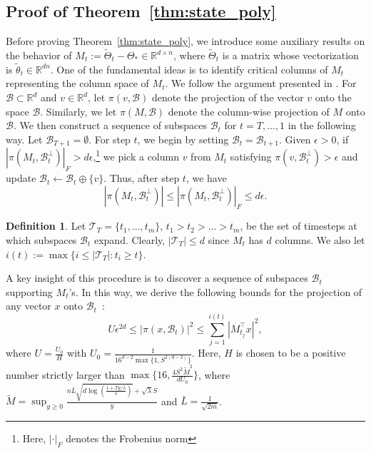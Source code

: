 \documentclass[11pt]{article}
\theoremstyle{plain}
\theoremstyle{definition}
\newtheorem{defn}[thm]{Definition}
\theoremstyle{remark}
\begin{document}
\subsection{Proof of Theorem~\ref{thm:state_poly}}\label{app:polystate}

Before proving Theorem~\ref{thm:state_poly},
we introduce some auxiliary results on the behavior of $M_t := \tilde \Theta_t - \Theta_* \in \mathbb{R}^{d \times n}$, where $\tilde \Theta_t$ is a matrix whose vectorization is $\tilde \theta_t \in \mathbb{R}^{dn}$.
One of the fundamental ideas is to identify critical columns of $M_t$ representing the column space of $M_t$.
We follow the argument presented in  \cite[Appendix D]{abbasi2011regret}. 
For $\mathcal{B} \subset \mathbb{R}^d$ and $v\in\mathbb{R}^d$, let $\pi(v,\mathcal{B})$ denote the projection of the vector $v$ onto the space $\mathcal{B}$.
Similarly, we let $\pi(M,\mathcal{B})$ denote the column-wise projection of $M$ onto $\mathcal{B}$.
We then construct a sequence of subspaces $\mathcal{B}_t$ for $t=T,\ldots,1$ in the following way.
Let $\mathcal{B}_{T+1} =\emptyset$.
For step $t$, we begin by setting $\mathcal{B}_{t}=\mathcal{B}_{t+1}$.
Given $\epsilon > 0$, 
if $|\pi(M_t,\mathcal{B}_t^\perp)|_F>d\epsilon$,\footnote{Here, $|\cdot|_F$ denotes the Frobenius norm} we pick a column $v$ from $M_t$ satisfying $\pi(v,\mathcal{B}_t^\perp)>\epsilon$ and update $\mathcal{B}_t\leftarrow\mathcal{B}_t\oplus \{v\}$.
Thus, after step $t$, we have
\begin{equation}\label{perpend}
|\pi(M_t,\mathcal{B}_t^\perp)|\leq |\pi(M_t,\mathcal{B}_t^\perp)|_F\leq d\epsilon.
\end{equation}

\begin{defn}
Let $\mathcal{T}_T= \{ t_1, \ldots, t_m\}$, $t_1>t_2>...>t_m$, be the set of timesteps at which subspaces $\mathcal{B}_t$ expand. Clearly, $|\mathcal{T}_T| \leq d$ since $M_t$ has $d$ columns. We also let $i(t):=\max\{i\leq |\mathcal{T}_T|:t_i \geq t\}$.
\end{defn}

A key insight of this procedure is to discover a sequence of subspaces $\mathcal{B}_t$ supporting $M_t$'s.
In this way, we derive the following bounds for the projection of any vector $x$ onto $\mathcal{B}_t$~\cite[Lemma 17]{abbasi2011regret}:
\begin{equation}\label{lem:17}
U\epsilon^{2d} \leq |\pi(x,\mathcal{B}_t)|^2 \leq \sum_{j=1}^{i(t)}|M_{t_j}^\top x|^2,
\end{equation}
where $U = \frac{U_0}{H}$ with 
$U_0 =\frac{1}{16^{d-2}\max\{1,S^{2(d-2)}\}}$.
Here, $H$ is chosen to be a positive number strictly larger than $\max\{16,\frac{4S^2\tilde M^2}{dU_0}\}$, where
$\tilde M = \sup_{y\geq 0}\frac{n\bar{L}\sqrt{d\log(\frac{1+Ty/\lambda}{ \delta})}+\sqrt{\lambda}S}{y}$ and $\bar{L} = \frac{1}{\sqrt{2m}}$.
\end{document}
